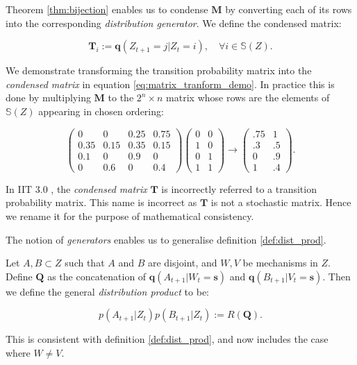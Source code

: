 Theorem \ref{thm:bijection} enables us to condense $\mathbf{M}$ by converting each of its rows into the corresponding \textit{distribution generator}. We define the condensed matrix:

\begin{equation}
\label{def:generators}
\mathbf{T}_{i} := \mathbf{q}(Z_{t+1} = j| Z_t = i) , \quad \forall i \in \mathbb{S}(Z).
\end{equation}

We demonstrate transforming the transition probability matrix into the \textit{condensed matrix} in equation \ref{eq:matrix_tranform_demo}. In practice this is done by multiplying $\mathbf{M}$ to the $2^n \times n$ matrix whose rows are the elements of $\mathbb{S}(Z)$ appearing in chosen ordering:



\begin{equation}
\label{eq:matrix_tranform_demo}
\left( \begin{array}{cccc} 0&0&0.25&0.75\\
							0.35&0.15&0.35&0.15\\
							0.1&0&0.9&0\\
							0&0.6&0&0.4
							\end{array} \right) 							
\left(\begin{array}{cc}0&0\\
1&0\\
0&1\\
1&1 \end{array} \right)
\rightarrow \left( \begin{array}{cc}.75&1\\
											.3&.5\\
											0&.9\\
											1&.4 \end{array} \right).
\end{equation}

\begin{remark}
	In IIT 3.0 \cite{oizumi2014phenomenology}, the \textit{condensed matrix} $\mathbf{T}$ is incorrectly referred to a transition probability matrix. This name is incorrect as $\mathbf{T}$ is not a stochastic matrix. Hence we rename it for the purpose of mathematical consistency.
\end{remark}

The notion of \textit{generators} enables us to generalise definition \ref{def:dist_prod}. 

\begin{definition}
	\label{def:dist_prod_gen}
	Let $A, B \subset Z$ such that $A$ and $B$ are disjoint, and $W,V$ be mechanisms in $Z$. Define $\mathbf{Q}$ as the concatenation of $\mathbf{q}(A_{t+1}|W_t = \mathbf{s})$ and 	$\mathbf{q}(B_{t+1}|V_t = \mathbf{s})$. Then we define the general \textit{distribution product} to be:
	
	\[p(A_{t+1}|Z_t)p(B_{t+1}|Z_t):=R(\mathbf{Q}).\]
	
	This is consistent with definition \ref{def:dist_prod}, and now includes the case where $W \neq V$.
\end{definition}

